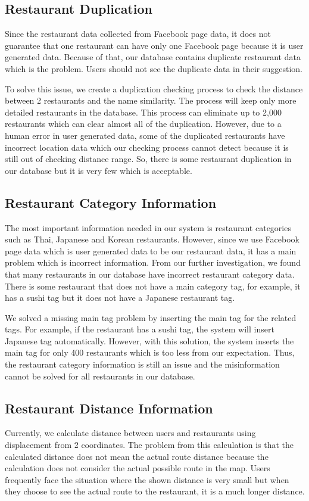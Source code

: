 \documentclass[12pt,oneside,openright,a4paper]{cpe-english-project}
\begin{document}
\subsection{Restaurant Duplication}
Since the restaurant data collected from Facebook page data, it does not guarantee that one restaurant can have only one Facebook page because it is user generated data. Because of that, our database contains duplicate restaurant data which is the problem. Users should not see the duplicate data in their suggestion.

To solve this issue, we create a duplication checking process to check the distance between 2 restaurants and the name similarity. The process will keep only more detailed restaurants in the database. This process can eliminate up to 2,000 restaurants which can clear almost all of the duplication. However, due to a human error in user generated data, some of the duplicated restaurants have incorrect location data which our checking process cannot detect because it is still out of checking distance range. So, there is some restaurant duplication in our database but it is very few which is acceptable.

\subsection{Restaurant Category Information}
The most important information needed in our system is restaurant categories such as Thai, Japanese and Korean restaurants. However, since we use Facebook page data which is user generated data to be our restaurant data, it has a main problem which is incorrect information. From our further investigation, we found that many restaurants in our database have incorrect restaurant category data. There is some restaurant that does not have a main category tag, for example, it has a sushi tag but it does not have a Japanese restaurant tag.

We solved a missing main tag problem by inserting the main tag for the related tags. For example, if the restaurant has a sushi tag, the system will insert Japanese tag automatically. However, with this solution, the system inserts the main tag for only 400 restaurants which is too less from our expectation. Thus, the restaurant category information is still an issue and the misinformation cannot be solved for all restaurants in our database.

\subsection{Restaurant Distance Information}
Currently, we calculate distance between users and restaurants using displacement from 2 coordinates. The problem from this calculation is that the calculated distance does not mean the actual route distance because the calculation does not consider the actual possible route in the map. Users frequently face the situation where the shown distance is very small but when they choose to see the actual route to the restaurant, it is a much longer distance.
\end{document}
